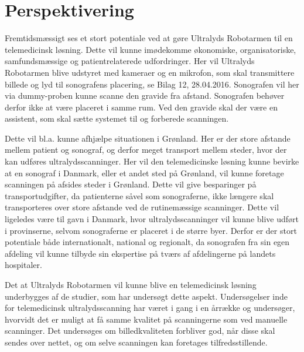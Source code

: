 \chapter{Perspektivering}

Fremtidsmæssigt ses et stort potentiale ved at gøre Ultralyds Robotarmen til en telemedicinsk løsning. Dette vil kunne imødekomme økonomiske, organisatoriske, samfundsmæssige og patientrelaterede udfordringer. Her vil Ultralyds Robotarmen blive udstyret med kameraer og en mikrofon, som skal transmittere billede og lyd til sonografens placering, se Bilag 12, 28.04.2016. Sonografen vil her via dummy-proben kunne scanne den gravide fra afstand. Sonografen behøver derfor ikke at være placeret i samme rum. Ved den gravide skal der være en assistent, som skal sætte systemet til og forberede scanningen.
 
Dette vil bl.a. kunne afhjælpe situationen i Grønland. \cite{greenland} Her er der store afstande mellem patient og sonograf, og derfor meget transport mellem steder, hvor der kan udføres ultralydsscanninger. Her vil den telemedicinske løsning kunne bevirke at en sonograf i Danmark, eller et andet sted på Grønland, vil kunne foretage scanningen på afsides steder i Grønland. Dette vil give besparinger på transportudgifter, da patienterne såvel som sonograferne, ikke længere skal transporteres over store afstande ved de rutinemæssige scanninger. 
Dette vil ligeledes være til gavn i Danmark, hvor ultralydsscanninger vil kunne blive udført i provinserne, selvom sonograferne er placeret i de større byer.
Derfor er der stort potentiale både internationalt, national og regionalt, da sonografen fra sin egen afdeling vil kunne tilbyde sin ekspertise på tværs af afdelingerne på landets hospitaler. 

Det at Ultralyds Robotarmen vil kunne blive en telemedicinsk løsning underbygges af de studier, som har undersøgt dette aspekt. Undersøgelser inde for telemedicinsk ultralydsscanning har været i gang i en årrække og undersøger, hvorvidt det er muligt at få samme kvalitet på scanningerne som ved manuelle scanninger. Det undersøges om billedkvaliteten forbliver god, når disse skal sendes over nettet, og om selve scanningen kan foretages tilfredsstillende\citep{5}\citep{8}\citep{18}. 

